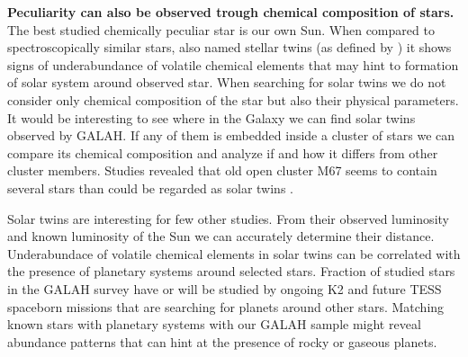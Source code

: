 
\textbf{Peculiarity can also be observed trough chemical composition of stars.} The best studied chemically peculiar star is our own Sun. When compared to spectroscopically similar stars, also named stellar twins (as defined by \cite{2017AN....338..442A}) it shows signs of underabundance of volatile chemical elements \cite{2009ApJ...704L..66M} that may hint to formation of solar system around observed star. When searching for solar twins we do not consider only chemical composition of the star but also their physical parameters. It would be interesting to see where in the Galaxy we can find solar twins observed by GALAH. If any of them is embedded inside a cluster of stars we can compare its chemical composition and analyze if and how it differs from other cluster members. Studies revealed that old open cluster M67 seems to contain several stars than could be regarded as solar twins \cite{2009MmSAI..80..125B, 2016MNRAS.463..696L}.

Solar twins are interesting for few other studies. From their observed luminosity and known luminosity of the Sun we can accurately determine their distance. Underabundace of volatile chemical elements in solar twins can be correlated with the presence of planetary systems around selected stars. Fraction of studied stars in the GALAH survey have or will be studied by ongoing K2 \cite{2014PASP..126..398H} and future TESS \cite{2014SPIE.9143E..20R} spaceborn missions that are searching for planets around other stars. Matching known stars with planetary systems with our GALAH sample might reveal abundance patterns that can hint at the presence of rocky or gaseous planets.

